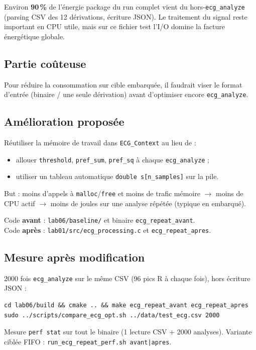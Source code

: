 \documentclass[a4paper,12pt]{article}
\begin{document}
Environ \textbf{90\,\%} de l'énergie package du run complet vient du hors-\texttt{ecg\_analyze} (parsing CSV des 12 dérivations, écriture JSON). Le traitement du signal reste important en CPU utile, mais sur ce fichier test l'I/O domine la facture énergétique globale.

\subsection{Partie coûteuse}
Pour réduire la consommation sur cible embarquée, il faudrait viser le format d'entrée (binaire / une seule dérivation) avant d'optimiser encore \texttt{ecg\_analyze}.

\subsection{Amélioration proposée}
Réutiliser la mémoire de travail dans \texttt{ECG\_Context} au lieu de :
\begin{itemize}
    \item allouer \texttt{threshold}, \texttt{pref\_sum}, \texttt{pref\_sq} à chaque \texttt{ecg\_analyze} ;
    \item utiliser un tableau automatique \texttt{double s[n\_samples]} sur la pile.
\end{itemize}
But : moins d'appels à \texttt{malloc}/\texttt{free} et moins de trafic mémoire $\rightarrow$ moins de CPU actif $\rightarrow$ moins de joules sur une analyse répétée (typique en embarqué).

Code \textbf{avant} : \texttt{lab06/baseline/} et binaire \texttt{ecg\_repeat\_avant}.\\
Code \textbf{après} : \texttt{lab01/src/ecg\_processing.c} et \texttt{ecg\_repeat\_apres}.

\subsection{Mesure après modification}
2000 fois \texttt{ecg\_analyze} sur le même CSV (96 pics R à chaque fois), hors écriture JSON :

\begin{verbatim}
cd lab06/build && cmake .. && make ecg_repeat_avant ecg_repeat_apres
sudo ../scripts/compare_ecg_opt.sh ../data/test_ecg.csv 2000
\end{verbatim}

Mesure \texttt{perf stat} sur tout le binaire (1 lecture CSV + 2000 analyses). Variante ciblée FIFO : \texttt{run\_ecg\_repeat\_perf.sh avant|apres}.
\end{document}
